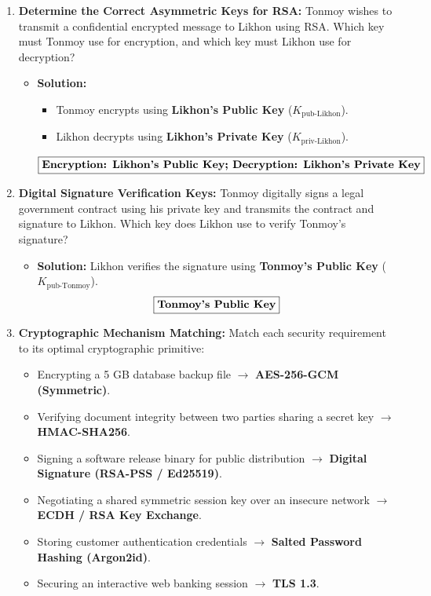 \begin{enumerate}[label=\textbf{Problem \arabic*.,resume},leftmargin=1.5cm]
\item \textbf{Determine the Correct Asymmetric Keys for RSA:}
Tonmoy wishes to transmit a confidential encrypted message to Likhon using RSA. Which key must Tonmoy use for encryption, and which key must Likhon use for decryption?
\begin{itemize}
\item \textbf{Solution:}
\begin{itemize}
\item Tonmoy encrypts using \textbf{Likhon's Public Key} ($K_{\text{pub-Likhon}}$).
\item Likhon decrypts using \textbf{Likhon's Private Key} ($K_{\text{priv-Likhon}}$).
\end{itemize}
\[ \boxed{\text{\textbf{Encryption: Likhon's Public Key; Decryption: Likhon's Private Key}}} \]
\end{itemize}

\item \textbf{Digital Signature Verification Keys:}
Tonmoy digitally signs a legal government contract using his private key and transmits the contract and signature to Likhon. Which key does Likhon use to verify Tonmoy's signature?
\begin{itemize}
\item \textbf{Solution:} Likhon verifies the signature using \textbf{Tonmoy's Public Key} ($K_{\text{pub-Tonmoy}}$).
\[ \boxed{\text{\textbf{Tonmoy's Public Key}}} \]
\end{itemize}

\item \textbf{Cryptographic Mechanism Matching:}
Match each security requirement to its optimal cryptographic primitive:
\begin{itemize}
\item Encrypting a 5 GB database backup file $\to$ \textbf{AES-256-GCM (Symmetric)}.
\item Verifying document integrity between two parties sharing a secret key $\to$ \textbf{HMAC-SHA256}.
\item Signing a software release binary for public distribution $\to$ \textbf{Digital Signature (RSA-PSS / Ed25519)}.
\item Negotiating a shared symmetric session key over an insecure network $\to$ \textbf{ECDH / RSA Key Exchange}.
\item Storing customer authentication credentials $\to$ \textbf{Salted Password Hashing (Argon2id)}.
\item Securing an interactive web banking session $\to$ \textbf{TLS 1.3}.
\end{itemize}
\end{enumerate}

